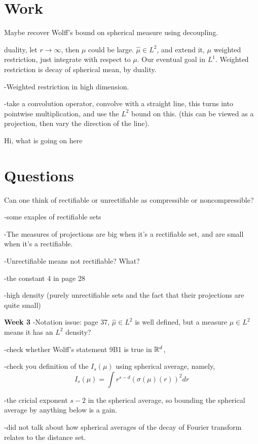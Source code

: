 \chapter{Work}
Maybe recover Wolff's bound on spherical measure using decoupling. 

duality, let $r\to\infty$, then $\mu$  could be large.
$\hat{\mu}\in L^2$, and extend it,  $\mu$ weighted restriction, just integrate with respect to $\mu$. Our eventual goal in $L^1$. Weighted restriction is decay of spherical mean, by duality.

-Weighted restriction in high dimension.

-take a convolution operator, convolve with a straight line, this turns into pointwise multiplication, and use the $L^2$ bound on this. (this can be viewed as a projection, then vary the direction of the line).

Hi, what is going on here
\chapter{Questions}

Can one think of rectifiable or unrectifiable as compressible or noncompressible?

-some exaples of rectifiable sets

-The measures of projections are big when it's a rectifiable set, and are small when it's a rectifiable.

-Unrectifiable means not rectifiable? What?


-the constant 4 in page 28

-high density (purely unrectifiable sets and the fact that their projections are quite small)


\textbf{Week 3}
-Notation issue: page 37, $\hat{\mu}\in L^2$ is well defined, but a measure $\mu\in L^2$ means it has an $L^2$ density?

-check whether Wolff's statement 9B1 is true in $\mathbb{R}^d$,

-check you definition of the $I_s(\mu)$ using spherical average, namely, 
\begin{equation*}
    I_s(\mu)=\int r^{s-d}(\sigma(\mu)(r))^2dr
\end{equation*}

-the cricial exponent $s-2$ in the spherical average, so bounding the spherical average by anything below is a gain.

-did not talk about how spherical averages of the decay of Fourier transform relates to the distance set.

